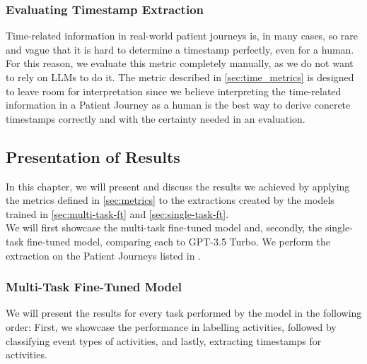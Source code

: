 \subsubsection{Evaluating Timestamp Extraction}\label{sec:eval_time}
Time-related information in real-world patient journeys is, in many cases, so rare and vague that it is hard to determine a timestamp perfectly, even for a human. For this reason, we evaluate this metric completely manually, as we do not want to rely on LLMs to do it. The metric described in \autoref{sec:time_metrics} is designed to leave room for interpretation since we believe interpreting the time-related information in a Patient Journey as a human is the best way to derive concrete timestamps correctly and with the certainty needed in an evaluation.

\subsection{Presentation of Results}\label{sec:results}
In this chapter, we will present and discuss the results we achieved by applying the metrics defined in \autoref{sec:metrics} to the extractions created by the models trained in \autoref{sec:multi-task-ft} and \autoref{sec:single-task-ft}.\\
We will first showcase the multi-task fine-tuned model and, secondly, the single-task fine-tuned model, comparing each to GPT-3.5 Turbo. We perform the extraction on the Patient Journeys listed in .

\subsubsection{Multi-Task Fine-Tuned Model}\label{sec_eval_multi}
We will present the results for every task performed by the model in the following order: First, we showcase the performance in labelling activities, followed by classifying event types of activities, and lastly, extracting timestamps for activities.

